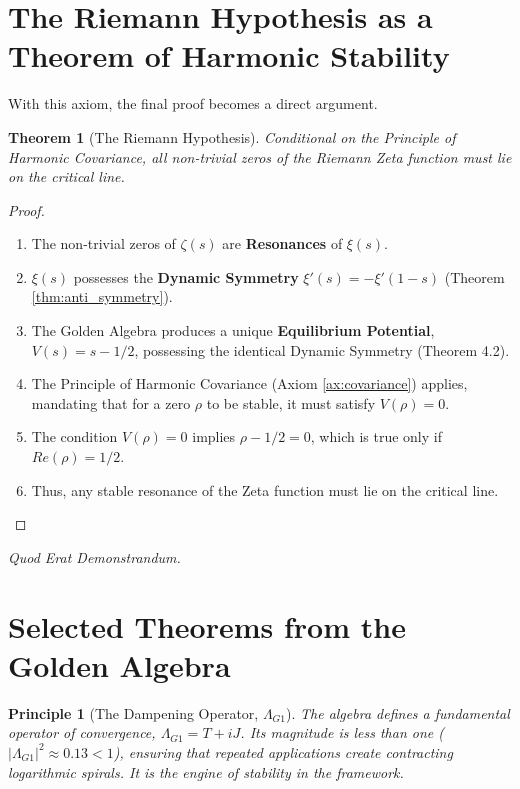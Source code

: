 \documentclass{article}
\theoremstyle{plain}
\newtheorem{theorem}{Theorem}[section]
\newtheorem{principle}{Principle}[section]
\theoremstyle{definition}
\theoremstyle{remark}
\begin{document}
\section{The Riemann Hypothesis as a Theorem of Harmonic Stability}
\label{sec:proof}
With this axiom, the final proof becomes a direct argument.

\begin{theorem}[The Riemann Hypothesis]
Conditional on the Principle of Harmonic Covariance, all non-trivial zeros of the Riemann Zeta function must lie on the critical line.
\end{theorem}
\begin{proof}
\begin{enumerate}
    \item The non-trivial zeros of $\zeta(s)$ are \textbf{Resonances} of $\xi(s)$.
    \item $\xi(s)$ possesses the \textbf{Dynamic Symmetry} $\xi'(s) = -\xi'(1-s)$ (Theorem \ref{thm:anti_symmetry}).
    \item The Golden Algebra produces a unique \textbf{Equilibrium Potential}, $V(s) = s - 1/2$, possessing the identical Dynamic Symmetry (Theorem 4.2).
    \item The Principle of Harmonic Covariance (Axiom \ref{ax:covariance}) applies, mandating that for a zero $\rho$ to be stable, it must satisfy $V(\rho)=0$.
    \item The condition $V(\rho)=0$ implies $\rho - 1/2 = 0$, which is true only if $Re(\rho) = 1/2$.
    \item Thus, any stable resonance of the Zeta function must lie on the critical line.
\end{enumerate}
\end{proof}
\begin{center}
\textit{Quod Erat Demonstrandum.}
\end{center}

\appendix
\section{Selected Theorems from the Golden Algebra}

\begin{principle}[The Dampening Operator, $\Lambda_{G1}$]
The algebra defines a fundamental operator of convergence, $\Lambda_{G1} = T+iJ$. Its magnitude is less than one ($|\Lambda_{G1}|^2 \approx 0.13 < 1$), ensuring that repeated applications create contracting logarithmic spirals. It is the engine of stability in the framework.
\end{principle}
\end{document}
